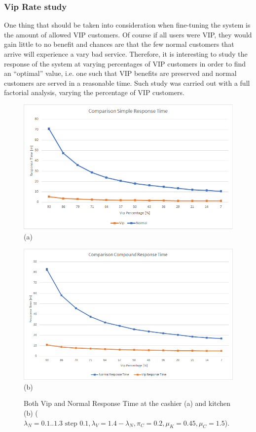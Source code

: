\subsubsection{Vip Rate study}

One thing that should be taken into consideration when fine-tuning the system is the amount of allowed VIP customers. Of course if all users were VIP, they would gain little to no benefit and chances are that the few normal customers that arrive will experience a vary bad service. Therefore, it is interesting to study the response of the system at varying percentages of VIP customers in order to find an ``optimal'' value, i.e. one such that VIP benefits are preserved and normal customers are served in a reasonable time. Such study was carried out with a full factorial analysis, varying the percentage of VIP customers.

\begin{figure}[H]
  \begin{minipage}{0.48\textwidth}
    \centering
    \includegraphics[width=\textwidth]{figs/comparisonSimpleResponseTime.png}
    (a)
  \end{minipage}\hspace{0.03\textwidth}
  \begin{minipage}{0.48\textwidth}
    \centering
    \includegraphics[width=\textwidth]{figs/comparisonCompoundResponseTime.png}
    (b)
  \end{minipage}
  \caption{Both Vip and Normal Response Time at the cashier (a) and kitchen (b) ($\lambda_N={{0.1..1.3 \text{ step } 0.1}},\lambda_V=1.4-\lambda_N,\pi_C=0.2, \mu_K=0.45, \mu_C=1.5$).}
  \label{}
\end{figure}


